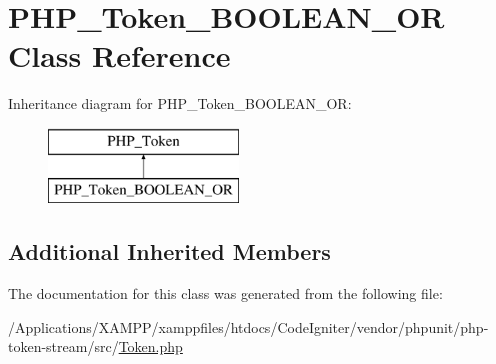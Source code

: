 \hypertarget{class_p_h_p___token___b_o_o_l_e_a_n___o_r}{}\section{P\+H\+P\+\_\+\+Token\+\_\+\+B\+O\+O\+L\+E\+A\+N\+\_\+\+OR Class Reference}
\label{class_p_h_p___token___b_o_o_l_e_a_n___o_r}
Inheritance diagram for P\+H\+P\+\_\+\+Token\+\_\+\+B\+O\+O\+L\+E\+A\+N\+\_\+\+OR\+:\begin{figure}[H]
\begin{center}
\leavevmode
\includegraphics[height=2.000000cm]{class_p_h_p___token___b_o_o_l_e_a_n___o_r}
\end{center}
\end{figure}
\subsection*{Additional Inherited Members}


The documentation for this class was generated from the following file\+:\begin{DoxyCompactItemize}
\item 
/\+Applications/\+X\+A\+M\+P\+P/xamppfiles/htdocs/\+Code\+Igniter/vendor/phpunit/php-\/token-\/stream/src/\mbox{\hyperlink{_token_8php}{Token.\+php}}\end{DoxyCompactItemize}
